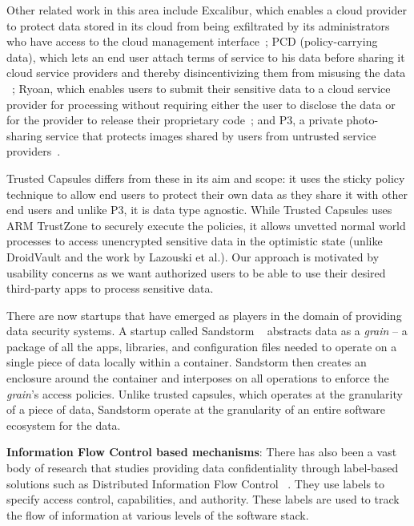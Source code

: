 Other related work in this area include Excalibur, which enables a cloud
provider to protect data stored in its cloud from being exfiltrated by its
administrators who have access to the cloud management
interface~\cite{excalibur}; PCD (policy-carrying data), which lets an end user
attach terms of service to his data before sharing it cloud service providers
and thereby disincentivizing them from misusing the data ~\cite{policydata};
Ryoan, which enables users to submit their sensitive data to a cloud service
provider for processing without requiring either the user to disclose the data
or for the provider to release their proprietary code~\cite{ryoan}; and P3, a
private photo-sharing service that protects images shared by users from
untrusted service providers~\cite{p3}.

Trusted Capsules differs from these in its aim and scope: it uses the sticky
policy technique to allow end users to protect their own data as they share it
with other end users and unlike P3, it is data type agnostic. While Trusted
Capsules uses ARM TrustZone to securely execute the policies, it allows unvetted
normal world processes to access unencrypted sensitive data in the optimistic
state (unlike DroidVault and the work by Lazouski et al.). Our approach is
motivated by usability concerns as we want authorized users to be able to use
their desired third-party apps to process sensitive data.

There are now startups that have emerged as players in the domain of providing data security systems. A startup called Sandstorm ~\cite{sandstorm} abstracts data 
as a \textit{grain} -- a package of all 
the apps, libraries, and configuration files needed to operate on a single 
piece of data locally within a container. Sandstorm then creates an 
enclosure around the container and interposes on all operations to enforce the \textit{grain}'s
access policies.
Unlike trusted capsules, which operates at the granularity of a
piece of data, Sandstorm operate at the granularity of an entire
software ecosystem for the data.

\textbf{Information Flow Control based mechanisms}: There has also been a vast body of research that studies providing data confidentiality through label-based solutions such as Distributed Information Flow Control ~\cite{jif, asbestos, histar, dstar, laminar, aeolus, flume}. They use labels to specify access control, 
capabilities, and authority. These labels are used to track the flow of information at various levels of the software stack. 

